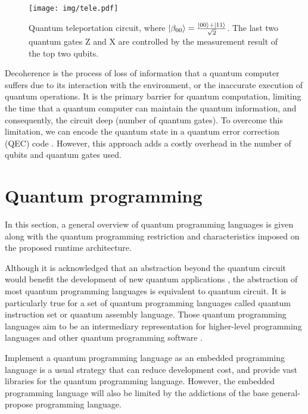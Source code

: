 \documentclass[preprint,3p,times,twocolumn]{elsarticle}
\begin{document}
\begin{figure}[h]
    \centering
    \texttt{[image: img/tele.pdf]}
    \caption{Quantum teleportation circuit, where $\ket{\beta_{00}} =
    \frac{\ket{00}+\ket{11}}{\sqrt{2}}$. The last two quantum
    gates Z and X are controlled by the measurement result of the top two
    qubits.}
    \label{fig:tele}
\end{figure}

Decoherence is the process of loss of information that a quantum computer
suffers due to its interaction with the environment, or the inaccurate
execution of quantum operations. It is the primary barrier for quantum
computation, limiting the time that a quantum computer can maintain the quantum
information, and consequently, the circuit deep (number of quantum gates). To
overcome this limitation, we can encode the quantum state in a quantum error
correction (QEC) code \cite{Devitt2013}. However, this approach adds a costly
overhead in the number of qubits and quantum gates used.

\section{Quantum programming}
\label{sec:programming}

In this section, a general overview of quantum programming languages is given
along with the quantum programming restriction and characteristics imposed on
the proposed runtime architecture.

Although it is acknowledged that an abstraction beyond the quantum circuit
would benefit the development of new quantum applications \cite{Svore2006}, the
abstraction of most quantum programming languages is equivalent to quantum
circuit.  It is particularly true for a set of quantum programming languages
\cite{Smith2016, Fu2019, Khammassi2018, Cross2017, Killoran2019} called quantum
instruction set or quantum assembly language. Those quantum programming
languages aim to be an intermediary representation for higher-level programming
languages and other quantum programming software \cite{qiskit, Smith2016,
Killoran2019}.  

Implement a quantum programming language as an embedded programming language is
a usual strategy \cite{Green2013, Steiger2018, Killoran2019, Wecker2014,
Javadiabhari2015} that can reduce development cost, and provide vast libraries
for the quantum programming language. However, the embedded programming
language will also be limited by the addictions of the base general-propose
programming language.
\end{document}
